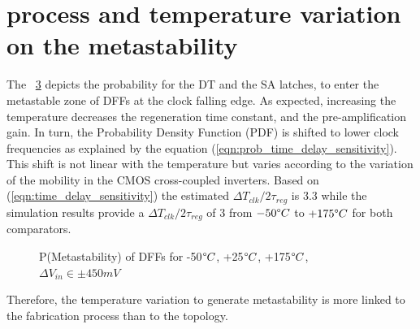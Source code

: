 \section{process and temperature variation on the metastability}
The \figurename~\ref{fig:prob_met_zone_temp} depicts the probability for the DT and the SA latches, to enter the metastable zone of DFFs at the clock falling edge. As expected, increasing the temperature decreases the regeneration time constant, and the pre-amplification gain. In turn, the Probability Density Function (PDF) is shifted to lower clock frequencies as explained by the equation (\ref{eqn:prob_time_delay_sensitivity}). This shift is not linear with the temperature but varies according to the variation of the mobility in the CMOS cross-coupled inverters. Based on (\ref{eqn:time_delay_sensitivity}) the estimated $\Delta T_{clk}/2\tau_{reg}$ is 3.3 while the simulation results provide a $\Delta T_{clk}/2\tau_{reg}$ of 3 from $-50 \degree C$ to $+175 \degree C$ for both comparators. 
\begin{figure}[htp]
	\centering
	\hspace{0.1cm}
	\begin{subfigure}[b]{0.48\textwidth}
		
		\label{fig:dtl_prob_met_zone_temp}
	\end{subfigure}
	\hspace{0.25cm}
	\begin{subfigure}[b]{0.48\textwidth}
		
		\label{fig:SA_prob_met_zone_temp}
	\end{subfigure}
	\caption{P(Metastability) of DFFs for -50$\degree C$, +25$\degree C$, +175$\degree C$, $\Delta V_{in} \in \pm 450 mV$}
	\label{fig:prob_met_zone_temp}
\end{figure}
Therefore, the temperature variation to generate metastability is more linked to the fabrication process than to the topology.

